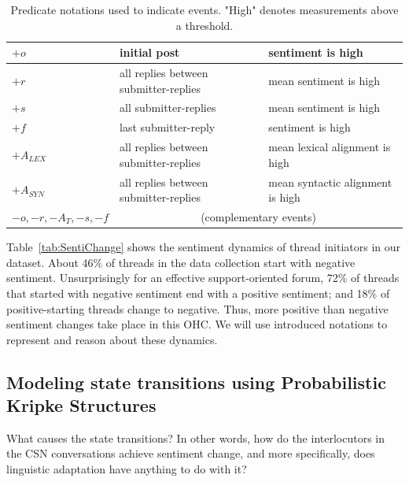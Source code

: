 \documentclass[man,biblatex,floatsintext]{apa6}
\begin{document}
\begin{table}[tb]
\centering
\begin{tabular}{l|l|l}
                             
$+o$         & initial post & sentiment is high     \\ \hline
$+r$         & all replies between submitter-replies & mean sentiment is high     \\ \hline
$+s$         & all submitter-replies  & mean sentiment is high     \\ \hline
$+f$         & last submitter-reply & sentiment is high     \\ \hline
$+A_{LEX}$         & all replies between submitter-replies & mean lexical alignment is high \\ \hline
$+A_{SYN}$         & all replies between submitter-replies & mean syntactic alignment is high \\ \hline
$-o,-r,-A_T,-s,-f$         & \multicolumn{2}{c}{(complementary events)}  \\
\end{tabular}
\caption{Predicate notations used to indicate events.  "High" denotes measurements above a threshold.}
\label{tab:notations}
\end{table}


Table~\ref{tab:SentiChange} shows the sentiment dynamics of thread initiators in our dataset. About 46\% of threads in the data collection start with negative sentiment. Unsurprisingly for an effective support-oriented forum, 72\% of threads that started with negative sentiment end with a positive sentiment; and 18\% of positive-starting threads change to negative. Thus,  more positive than negative sentiment changes take place in this OHC. We will use introduced notations to represent and reason about these dynamics.

\subsection{Modeling state transitions using Probabilistic Kripke Structures \label{sec:ProbKS}}

What causes the state transitions?  In other words, how do the interlocutors in the CSN conversations achieve sentiment change, and more specifically, does linguistic adaptation have anything to do with it?
\end{document}
